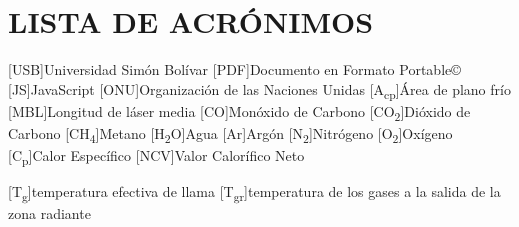 \chapter*{LISTA DE ACRÓNIMOS}

\begin{acronym}

[USB]{Universidad Simón Bolívar}
[PDF]{Documento en Formato Portable\copyright}
[JS]{JavaScript}
[ONU]{Organización de las Naciones Unidas}
[A\textsubscript{cp}]{Área de plano frío}
[MBL]{Longitud de láser media}
[CO]{Monóxido de Carbono}
[CO\textsubscript{2}]{Dióxido de Carbono}
[CH\textsubscript{4}]{Metano}
[H\textsubscript{2}O]{Agua}
[Ar]{Argón}
[N\textsubscript{2}]{Nitrógeno}
[O\textsubscript{2}]{Oxígeno}
[C\textsubscript{p}]{Calor Específico}
[NCV]{Valor Calorífico Neto}

[T\textsubscript{g}]{temperatura efectiva de llama}
[T\textsubscript{gr}]{temperatura de los gases a la salida de la zona radiante}


\end{acronym}
\clearpage